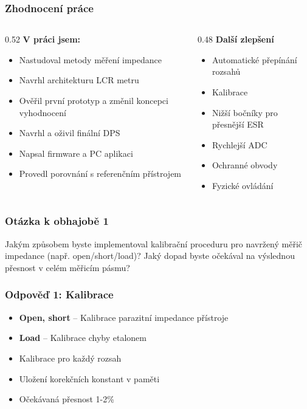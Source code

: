 \documentclass[
  12pt,
	t,
	aspectratio=1610,
	unicode,
]{beamer}
\begin{document}
\begin{frame}
	\frametitle{Zhodnocení práce}
	\small
	\begin{columns}[T]
		\begin{column}{0.52\textwidth}
			\textbf{V práci jsem:}
			\begin{itemize}
				\item Nastudoval metody měření impedance
				\item Navrhl architekturu LCR metru
				\item Ověřil první prototyp a změnil koncepci vyhodnocení
				\item Navrhl a oživil finální DPS
				\item Napsal firmware a PC aplikaci
				\item Provedl porovnání s referenčním přístrojem
			\end{itemize}
		\end{column}
		\begin{column}{0.48\textwidth}
			\textbf{Další zlepšení}
			\begin{itemize}
				\item Automatické přepínání rozsahů
				\item Kalibrace
				\item Nižší bočníky pro přesnější ESR
				\item Rychlejší ADC
				\item Ochranné obvody
				\item Fyzické ovládání
			\end{itemize}
		\end{column}
	\end{columns}
\end{frame}

\begin{frame}
	\frametitle{Otázka k obhajobě 1}
	\Large
	\begin{block}{}
		Jakým způsobem byste implementoval kalibrační proceduru pro navržený měřič impedance (např. open/short/load)? Jaký dopad byste očekával na výslednou přesnost v celém měřicím pásmu?
	\end{block}
\end{frame}

\begin{frame}
	\frametitle{Odpověď 1: Kalibrace}
	\large
	\begin{itemize}
		\item \textbf{Open, short} -- Kalibrace parazitní impedance přístroje
		\item \textbf{Load} -- Kalibrace chyby etalonem
		\item Kalibrace pro každý rozsah
		\item Uložení korekčních konstant v paměti
		\item Očekávaná přesnost 1-2\%
	\end{itemize}
\end{frame}
\end{document}
